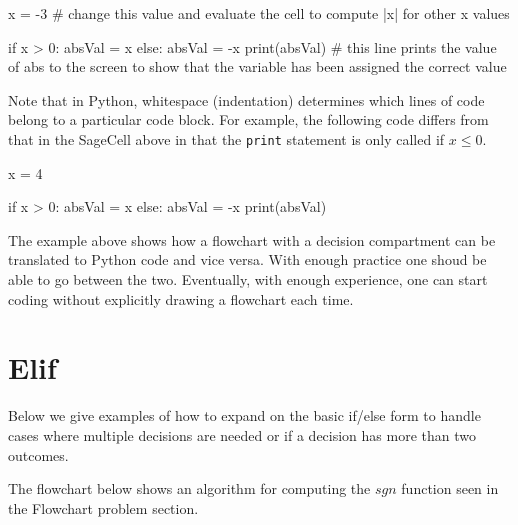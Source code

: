 \documentclass{ximera}
\begin{document}
\begin{sageCell}
x = -3               # change this value and evaluate the cell to compute |x| for other x values

if x > 0:
	absVal = x
else:
	absVal = -x
print(absVal)        # this line prints the value of abs to the screen to show that the variable has been assigned the correct value
\end{sageCell}

Note that in Python, whitespace (indentation) determines which lines of code belong to a particular code block. For example, the following code differs from that in the SageCell above in that the \verb|print| statement is only called if $x\leq 0$.

\begin{sageCell}
x = 4

if x > 0:
	absVal = x
else:
	absVal = -x
	print(absVal)
\end{sageCell}

The example above shows how a flowchart with a decision compartment can be translated to Python code and vice versa. With enough practice one shoud be able to go between the two. Eventually, with enough experience, one can start coding without explicitly drawing a flowchart each time.

\section{Elif}

Below we give examples of how to expand on the basic if/else form to handle cases where multiple decisions are needed or if a decision has more than two outcomes. 

The flowchart below shows an algorithm for computing the $sgn$ function seen in the Flowchart problem section.
\end{document}
